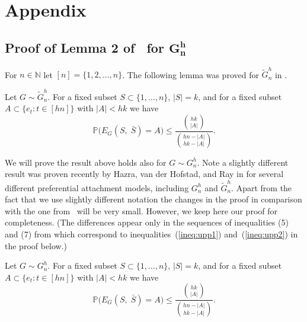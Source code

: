 \documentclass[runningheads, envcountsame, smallextended]{llncs}
\newcommand{\pr}{{\mathbb P}}
\numberwithin{theorem}{section}
\numberwithin{definition}{section}
\numberwithin{lemma}{section}
\numberwithin{corollary}{section}
\numberwithin{proposition}{section}
\numberwithin{conjecture}{section}
\numberwithin{remark}{section}
\numberwithin{equation}{section}
\begin{document}
 
 



\appendix
\section{Appendix}  \label{app:A}



\subsection{Proof of Lemma 2 of~\cite{mihail2006journal} for $\mathbf{G_n^h}$}


For $n \in \mathbb{N}$ let $[n]=\{1,2,\ldots,n\}$. The following lemma was proved for $\tilde{G}_n^h$ in \cite{mihail2006journal}.
\begin{lemma}\label{lem:lemma_2_MPS}
	Let $G\sim \tilde{G}_n^h$. For a fixed subset $S\subset \{1, \ldots, n\}$, $|S|=k$, and for a fixed subset $A \subset \{e_t : t \in [hn]\}$ with $|A|<hk$ we have
	\[\pr\Big( E_{G}(S, \; \bar{S}) = A \Big) \leq \frac{\binom{hk}{|A|}}{\binom{hn-|A|}{hk-|A|}}. \]
\end{lemma}
%
We will prove the result above 
holds also for 
$G\sim G_n^h$. 
Note a slightly different result was proven recently by Hazra, van der Hofstad, and Ray in \cite{hazra2023percolation} for several different preferential attachment models, including $G_n^h$ and $\tilde{G}_n^h$. 
Apart from the fact that we use slightly different notation the changes in the proof in comparison with the one from~\cite{mihail2006journal} will be very small. However, we keep here our proof for completeness. 
(The differences appear only in the sequences of inequalities (5) and (7) from \cite{mihail2006journal} which correspond to inequalities~(\ref{ineq:upp1}) and~(\ref{ineq:upp2}) in the proof below.)


\begin{lemma}\label{lem:lemma_2_us}
	Let $G\sim {G}_n^h$. For a fixed subset $S\subset \{1, \ldots, n\}$, $|S|=k$, and for a fixed subset $A \subset \{e_t : t \in [hn]\}$ with $|A|<hk$ we have
	\[
	\pr\Big( E_{G}(S, \; \bar{S}) = A \Big) \leq \frac{\binom{hk}{|A|}}{\binom{hn-|A|}{hk-|A|}}.
	\]
\end{lemma}

\newcommand{\good}{ 
	E_{G}(S, \; \bar{S})
}
\newcommand{\goodt}{
	E_{T_t}(S^{[m]}, \; \bar{S}^{[m]})
}
\newcommand{\goodtminusone}{
	E_{T_{t-1}}(S^{[m]}, \; \bar{S}^{[m]})
}
\newcommand{\inbadt}{
	\notin E_{T_t}(S^{[m]}, \; \bar{S}^{[m]})
}
\end{document}
